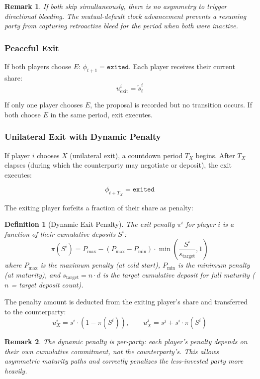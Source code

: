\documentclass[12pt]{article}
\newtheorem{definition}{Definition}
\newtheorem{remark}{Remark}
\begin{document}
\begin{remark}
If both skip simultaneously, there is no asymmetry to trigger directional bleeding.
The mutual-default clock advancement prevents a resuming party from capturing retroactive bleed for the period when both were inactive.
\end{remark}

\subsubsection{Peaceful Exit}

If both players choose $E$: $\phi_{t+1} = \texttt{exited}$. Each player receives their current share:
\[
u_{\text{exit}}^i = \tilde{s}_t^i
\]

If only one player chooses $E$, the proposal is recorded but no transition occurs. If both choose $E$ in the same period, exit executes.

\subsubsection{Unilateral Exit with Dynamic Penalty}
\label{sec:unilateral-exit}

If player $i$ chooses $X$ (unilateral exit), a countdown period $T_X$ begins. After $T_X$ elapses (during which the counterparty may negotiate or deposit), the exit executes:

\[
\phi_{t+T_X} = \texttt{exited}
\]

The exiting player forfeits a fraction of their share as penalty:

\begin{definition}[Dynamic Exit Penalty]
\label{def:dynamic-penalty}
The exit penalty $\pi^i$ for player $i$ is a function of their cumulative deposits $S^i$:
\[
\pi(S^i) = P_{\max} - (P_{\max} - P_{\min}) \cdot \min\!\left(\frac{S^i}{s_{\text{target}}}, 1\right)
\]
where $P_{\max}$ is the maximum penalty (at cold start), $P_{\min}$ is the minimum penalty (at maturity), and $s_{\text{target}} = n \cdot d$ is the target cumulative deposit for full maturity ($n$ = target deposit count).
\end{definition}

The penalty amount is deducted from the exiting player's share and transferred to the counterparty:
\[
u_X^i = s^i \cdot (1 - \pi(S^i)), \qquad u_X^j = s^j + s^i \cdot \pi(S^i)
\]

\begin{remark}
The dynamic penalty is \textit{per-party}: each player's penalty depends on their own cumulative commitment, not the counterparty's. This allows asymmetric maturity paths and correctly penalizes the less-invested party more heavily.
\end{remark}
\end{document}
